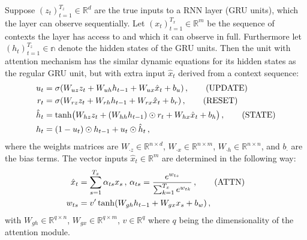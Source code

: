 \documentclass[12pt,a4paper]{article}
\newcommand{\Real}{\mathbb{R}}
\begin{document}
Suppose $(z_t)_{t=1}^{T_z} \in\Real^{d}$ are the true inputs to a RNN layer
(GRU units), which the layer can observe sequentially. Let $(x_t)_{t=1}^{T_x}\in\Real^{m}$
be the sequence of contexts the layer has access to and which it can observe in
full. Furthermore let $(h_t)_{t=1}^{T_z}\in\mathbb{n}$ denote the hidden states
of the GRU units. Then the unit with attention mechanism has the similar dynamic
equations for its hidden states as the regular GRU unit, but with extra input
$\hat{x}_t$ derived from a context sequence:
\begin{align*}
    u_t &= \sigma(W_{uz} z_t + W_{uh} h_{t-1} + W_{ux} \hat{x}_t + b_u)
        \,, \tag{\text{UPDATE}} \\
    r_t &= \sigma(W_{rz} z_t + W_{rh} h_{t-1} + W_{rx} \hat{x}_t + b_r)
        \,, \tag{\text{RESET}}  \\
    \hat{h}_t &= \tanh\bigl(W_{hz} z_t + (W_{hh} h_{t-1})\odot r_t + W_{hx} \hat{x}_t + b_h\bigr)
        \,, \tag{\text{STATE}} \\
    h_t &= (1 - u_t)\odot h_{t-1} + u_t \odot \hat{h}_t
        \,,
\end{align*}
where the weights matrices are $W_{\cdot z}\in\Real^{n\times d}$,
$W_{\cdot x}\in\Real^{n\times m}$, $W_{\cdot h}\in\Real^{n\times n}$, and
$b_\cdot$ are the bias terms. The vector inputs $\hat{x}_t\in\Real^{m}$ are
determined in the following way:
\begin{align*}
    \hat{x}_t &= \sum_{s=1}^{T_x} \alpha_{ts} x_s
        \,,\,
    \alpha_{ts} = \frac{e^{w_{ts}}}{\sum_{k=1}^{T_x} e^{w_{tk}}}
        \,, \tag{\text{ATTN}}\\
    w_{ts} &= v' \tanh(W_{gh} h_{t-1} + W_{gx} x_s + b_w)
        \,,
\end{align*}
with $W_{gh}\in\Real^{q\times n}$, $W_{gx}\in\Real^{q\times m}$, $v\in\Real^q$ where
$q$ being the dimensionality of the attention module.
\end{document}
